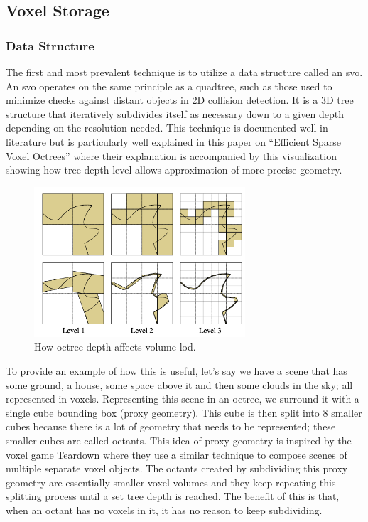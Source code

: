 \documentclass[titlepage]{article}
\begin{document}
\subsection{Voxel Storage}

\subsubsection{Data Structure}

The first and most prevalent technique is to utilize a data structure called an \gls{svo}. An \gls{svo} operates on the same principle as a quadtree, such as those used to minimize checks against distant objects in 2D collision detection. It is a 3D tree structure that iteratively subdivides itself as necessary down to a given depth depending on the resolution needed. This technique is documented well in literature but is particularly well explained in this paper on ``Efficient Sparse Voxel Octrees'' \cite{octree} where their explanation is accompanied by this visualization showing how tree depth level allows approximation of more precise geometry.

\begin{figure}[htp]
  \centering
  \includegraphics[width=0.7\textwidth]{octree.png}
  \caption{How octree depth affects volume \gls{lod}.}
\end{figure}
\FloatBarrier

To provide an example of how this is useful, let's say we have a scene that has some ground, a house, some space above it and then some clouds in the sky; all represented in voxels. Representing this scene in an octree, we surround it with a single cube bounding box (proxy geometry). This cube is then split into 8 smaller cubes because there is a lot of geometry that needs to be represented; these smaller cubes are called octants. This idea of proxy geometry is inspired by the voxel game Teardown \cite{proxy} where they use a similar technique to compose scenes of multiple separate voxel objects. The octants created by subdividing this proxy geometry are essentially smaller voxel volumes and they keep repeating this splitting process until a set tree depth is reached. The benefit of this is that, when an octant has no voxels in it, it has no reason to keep subdividing.
\end{document}
